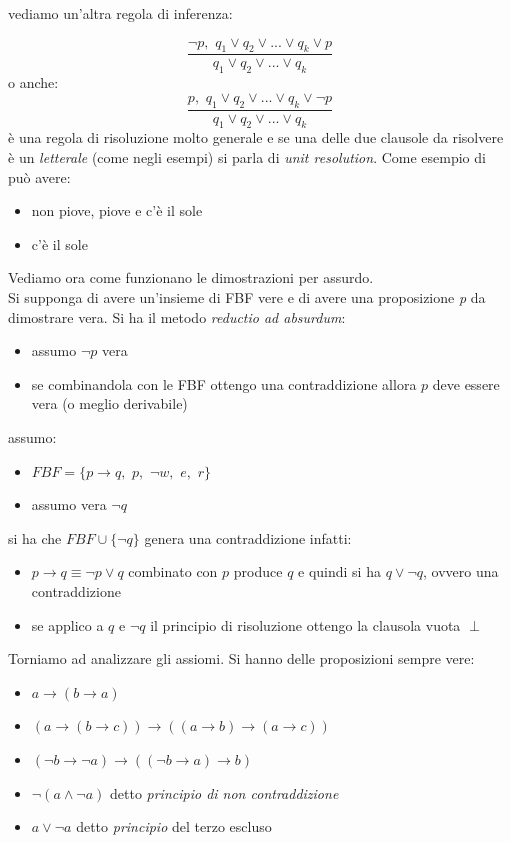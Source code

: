 \documentclass[a4paper,12pt, oneside]{book}
\begin{document}
\newpage
vediamo un'altra regola di inferenza:
\begin{esempio}
$$\frac{\neg p,\,\, q_1\vee q_2\vee ... \vee q_k \vee p}{q_1\vee q_2\vee ... \vee q_k}$$
o anche:
$$\frac{p,\,\, q_1\vee q_2\vee ... \vee q_k \vee \neg p}{q_1\vee q_2\vee ... \vee q_k}$$
è una regola di risoluzione molto generale e se una delle due clausole da risolvere è un \textit{letterale} (come negli esempi) si parla di \textit{unit resolution}. Come esempio di può avere:
\begin{itemize}
\item non piove, piove e c'è il sole
\item c'è il sole
\end{itemize}
\end{esempio}
Vediamo ora come funzionano le dimostrazioni per assurdo.\\
Si supponga di avere un'insieme di FBF vere e di avere una proposizione \textit{p} da dimostrare vera. Si ha il metodo \textit{reductio ad absurdum}:
\begin{itemize}
\item assumo $\neg p$ vera
\item se combinandola con le FBF ottengo una contraddizione allora $p$ deve essere vera (o meglio derivabile)
\end{itemize}
\begin{esempio}
assumo:
\begin{itemize}
\item $FBF=\{p\to q,\,\,p,\,\,\neg w,\,\,e,\,\,r\}$
\item assumo vera $\neg q$
\end{itemize}
si ha che $FBF\cup \{\neg q\}$ genera una contraddizione infatti:
\begin{itemize}
\item $p\to q \equiv\neg p\vee q$ combinato con $p$ produce $q$ e quindi si ha $q\vee\neg q$, ovvero una contraddizione
\item se applico a $q$ e $\neg q$ il principio di risoluzione ottengo la clausola vuota $\perp$
\end{itemize}
\end{esempio}
Torniamo ad analizzare gli assiomi. Si hanno delle proposizioni sempre vere:
\begin{itemize}
\item $a\to(b\to a)$
\item $(a\to(b\to c))\to((a\to b)\to(a\to c))$
\item $(\neg b\to \neg a)\to ((\neg b\to a)\to b)$
\item $\neg(a\wedge \neg a)$ detto \textit{principio di non contraddizione}
\item $a\vee \neg a$ detto \textit{principio} del terzo escluso
\end{itemize}
\end{document}
